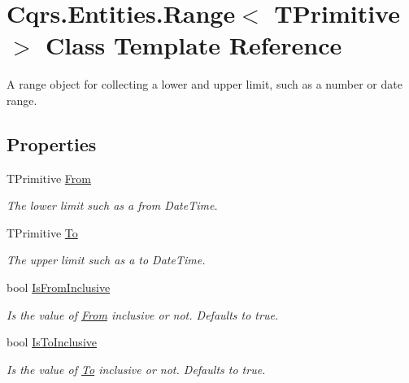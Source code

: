 \hypertarget{classCqrs_1_1Entities_1_1Range}{}\section{Cqrs.\+Entities.\+Range$<$ T\+Primitive $>$ Class Template Reference}
\label{classCqrs_1_1Entities_1_1Range}


A range object for collecting a lower and upper limit, such as a number or date range.  


\subsection*{Properties}
\begin{DoxyCompactItemize}
\item 
T\+Primitive \hyperlink{classCqrs_1_1Entities_1_1Range_a373db08544a25cb6d53411f56e0e072a}{From}
\begin{DoxyCompactList}\small\item\em The lower limit such as a from Date\+Time. \end{DoxyCompactList}\item 
T\+Primitive \hyperlink{classCqrs_1_1Entities_1_1Range_a06daca38005d4f4ff2156b99a95d2f92}{To}
\begin{DoxyCompactList}\small\item\em The upper limit such as a to Date\+Time. \end{DoxyCompactList}\item 
bool \hyperlink{classCqrs_1_1Entities_1_1Range_a135f90a2f05344538e79a40b5da28378}{Is\+From\+Inclusive}
\begin{DoxyCompactList}\small\item\em Is the value of \hyperlink{classCqrs_1_1Entities_1_1Range_a373db08544a25cb6d53411f56e0e072a}{From} inclusive or not. Defaults to true. \end{DoxyCompactList}\item 
bool \hyperlink{classCqrs_1_1Entities_1_1Range_a14cc90fd0525d94b2f3d4c69f19d013e}{Is\+To\+Inclusive}
\begin{DoxyCompactList}\small\item\em Is the value of \hyperlink{classCqrs_1_1Entities_1_1Range_a06daca38005d4f4ff2156b99a95d2f92}{To} inclusive or not. Defaults to true. \end{DoxyCompactList}\end{DoxyCompactItemize}


